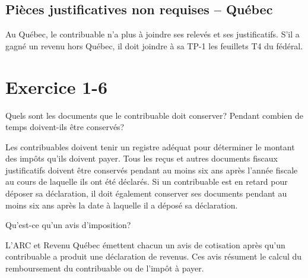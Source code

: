\subsection{Pièces justificatives non requises – Québec}
Au Québec, le contribuable n'a plus à joindre ses relevés et ses justificatifs. S'il a gagné un revenu hors Québec, il doit joindre à sa TP-1 les feuillets T4 du fédéral.



\section{Exercice 1-6}
\setcounter{question}{0}
\begin{question}
	Quels sont les documents que le contribuable doit conserver? Pendant combien de temps doivent-ils être conservés?
\end{question}
Les contribuables doivent tenir un registre adéquat pour déterminer le montant des impôts qu'ils doivent payer. Tous les reçus et autres documents fiscaux justificatifs doivent être conservés pendant au moins six ans après l'année fiscale au cours de laquelle ils ont été déclarés. Si un contribuable est en retard pour déposer sa déclaration, il doit également conserver ses documents pendant au moins six ans après la date à laquelle il a déposé sa déclaration.

\begin{question}
	Qu'est-ce qu'un avis d'imposition?
\end{question}
L'ARC et Revenu Québec émettent chacun un avis de cotisation après qu'un contribuable a produit une déclaration de revenus. Ces avis résument le calcul du remboursement du contribuable ou de l'impôt à payer.



